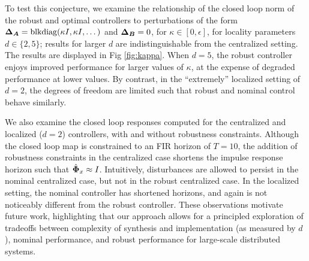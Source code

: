 To test this conjecture, we examine the relationship of the closed loop norm of the robust and optimal controllers to perturbations of the form ${\boldsymbol{\Delta}}_{\boldsymbol{A}} = \mathrm{blkdiag}(\kappa I, \kappa I, \dots)$ and ${\boldsymbol{\Delta}}_{\boldsymbol{B}} = 0$, for $\kappa \in [0,\epsilon]$, for locality parameters $d\in\{2,5\}$; results for larger $d$ are indistinguishable from the centralized setting. The results are displayed in Fig \ref{fig:kappa}.  When $d=5$, the robust controller enjoys improved performance for larger values of $\kappa$, at the expense of degraded performance at lower values. By contrast, in the ``extremely'' localized setting of $d=2$, the degrees of freedom are limited such that robust and nominal control behave similarly.  

We also examine the closed loop responses computed for the centralized and localized ($d=2$) controllers, with and without robustness constraints. Although the closed loop map is constrained to an FIR horizon of $T=10$, the addition of robustness constraints in the centralized case shortens the impulse response horizon such that $\hat{\boldsymbol{\Phi}}_x \approx I$. Intuitively, disturbances are allowed to persist in the nominal centralized case, but not in the robust centralized case. In the localized setting, the nominal controller has shortened horizons, and again is not noticeably different from the robust controller. These observations motivate future work, highlighting that our approach allows for a principled exploration of tradeoffs between complexity of synthesis and implementation (as measured by $d$), nominal performance, and robust performance for large-scale distributed systems.

